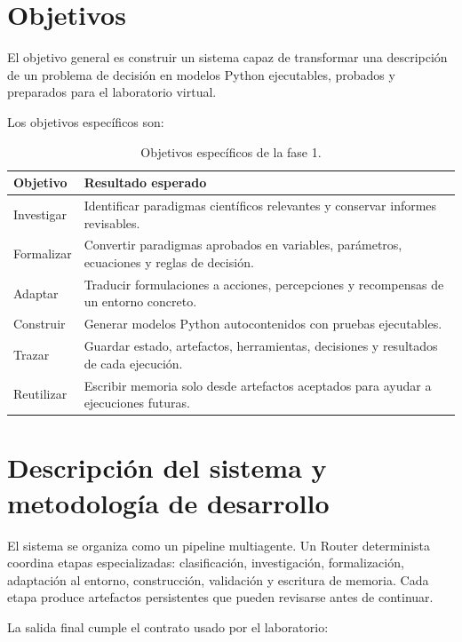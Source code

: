\section{Objetivos}

El objetivo general es construir un sistema capaz de transformar una descripción
de un problema de decisión en modelos Python ejecutables, probados y
preparados para el laboratorio virtual.

Los objetivos específicos son:

\begin{table}[H]
\begin{center}
\small
\begin{tabular}{|p{3cm}|p{9.5cm}|} \hline
\textbf{Objetivo} & \textbf{Resultado esperado} \\ \hline
Investigar & Identificar paradigmas científicos relevantes y conservar informes revisables. \\ \hline
Formalizar & Convertir paradigmas aprobados en variables, parámetros, ecuaciones y reglas de decisión. \\ \hline
Adaptar & Traducir formulaciones a acciones, percepciones y recompensas de un entorno concreto. \\ \hline
Construir & Generar modelos Python autocontenidos con pruebas ejecutables. \\ \hline
Trazar & Guardar estado, artefactos, herramientas, decisiones y resultados de cada ejecución. \\ \hline
Reutilizar & Escribir memoria solo desde artefactos aceptados para ayudar a ejecuciones futuras. \\ \hline
\end{tabular}
\caption{Objetivos específicos de la fase 1.}
\end{center}
\end{table}

\section{Descripción del sistema y metodología de desarrollo}

El sistema se organiza como un pipeline multiagente. Un Router determinista
coordina etapas especializadas: clasificación, investigación, formalización,
adaptación al entorno, construcción, validación y escritura de memoria. Cada
etapa produce artefactos persistentes que pueden revisarse antes de continuar.

La salida final cumple el contrato usado por el laboratorio:

